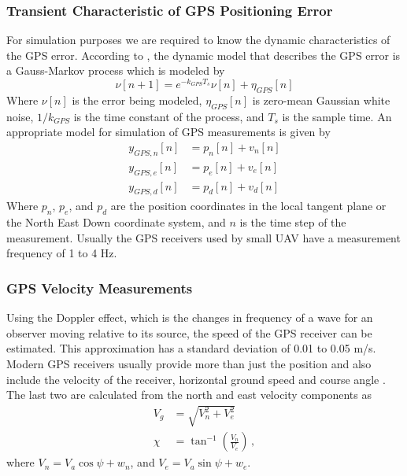 \subsubsection{Transient Characteristic of GPS Positioning Error}
For simulation purposes we are required to know the dynamic characteristics of the GPS error. According to \cite{Rankin1994}, the dynamic model that describes the GPS error is a Gauss-Markov process which is modeled by
\begin{equation}
\nu[n+1]=e^{-k_{GPS}T_s}\nu[n]+\eta_{GPS}[n]
\end{equation}
Where \begin{math} \nu[n] \end{math} is the error being modeled, \begin{math} \eta_{GPS}[n] \end{math} is zero-mean Gaussian white noise, \begin{math} 1/k_{GPS} \end{math} is the time constant of the process, and \begin{math} T_s \end{math} is the sample time. An appropriate model for simulation of GPS measurements is given by
\begin{align}
y_{GPS,n}[n]&=p_n[n]+v_n[n]\\
y_{GPS,e}[n]&=p_e[n]+v_e[n]\\
y_{GPS,d}[n]&=p_d[n]+v_d[n]
\end{align}
Where \begin{math}p_n\end{math}, \begin{math}p_e\end{math}, and \begin{math} p_d\end{math} are the position coordinates in the local tangent plane or the North East Down coordinate system, and \begin{math} n \end{math} is the time step of the measurement. Usually the GPS receivers used by small UAV have a measurement frequency of 1 to 4 Hz.

\subsubsection{GPS Velocity Measurements}
Using the Doppler effect, which is the changes in frequency of a wave for an observer moving relative to its source, the speed of the GPS receiver can be estimated. This approximation has a standard deviation of 0.01 to 0.05 m/s. Modern GPS receivers usually provide more than just the position and also include the velocity of the receiver, horizontal ground speed and course angle \cite{Beard2010}.
The last two are calculated from the north and east velocity components as
\begin{align}
V_g&=\sqrt{V_n^2+V_e^2} \label{eq:Vg}\\
\chi&=\tan^{-1}\left(\frac{V_n}{V_e}\right)\,,\label{eq:chi}
\end{align}
where $ V_n=V_a\cos\psi+w_n $, and $ V_e=V_a\sin\psi+w_e $. 

